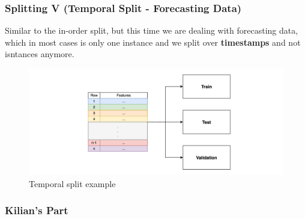 \documentclass[t,english]{beamer}
\begin{document}
\begin{frame}
  \frametitle{Splitting V (Temporal Split - Forecasting Data)}
    Similar to the in-order split, but this time we are dealing with forecasting data, which in most cases is only one instance and we split over \textbf{timestamps} and not isntances anymore.

    \begin{figure}[H]
        \includegraphics[width=1\textwidth]{figures/splitting/temporal_split.png}
        \caption{Temporal split example}
        \label{fig:temporal_split}
    \end{figure}
\end{frame}

\begin{frame}
  \frametitle{Kilian's Part}
    
\end{frame}
\end{document}
